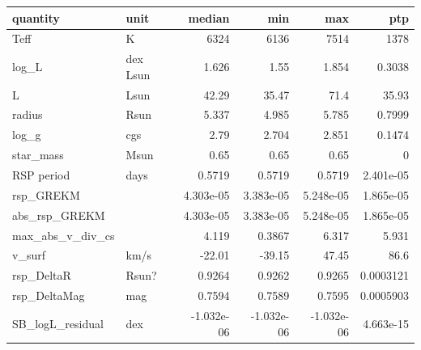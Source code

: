 \begin{tabular}{llrrrr}
\toprule
quantity & unit & median & min & max & ptp \\
\midrule
Teff & K & 6324 & 6136 & 7514 & 1378 \\
log_L & dex Lsun & 1.626 & 1.55 & 1.854 & 0.3038 \\
L & Lsun & 42.29 & 35.47 & 71.4 & 35.93 \\
radius & Rsun & 5.337 & 4.985 & 5.785 & 0.7999 \\
log_g & cgs & 2.79 & 2.704 & 2.851 & 0.1474 \\
star_mass & Msun & 0.65 & 0.65 & 0.65 & 0 \\
RSP period & days & 0.5719 & 0.5719 & 0.5719 & 2.401e-05 \\
rsp_GREKM &  & 4.303e-05 & 3.383e-05 & 5.248e-05 & 1.865e-05 \\
abs_rsp_GREKM &  & 4.303e-05 & 3.383e-05 & 5.248e-05 & 1.865e-05 \\
max_abs_v_div_cs &  & 4.119 & 0.3867 & 6.317 & 5.931 \\
v_surf & km/s & -22.01 & -39.15 & 47.45 & 86.6 \\
rsp_DeltaR & Rsun? & 0.9264 & 0.9262 & 0.9265 & 0.0003121 \\
rsp_DeltaMag & mag & 0.7594 & 0.7589 & 0.7595 & 0.0005903 \\
SB_logL_residual & dex & -1.032e-06 & -1.032e-06 & -1.032e-06 & 4.663e-15 \\
\bottomrule
\end{tabular}
